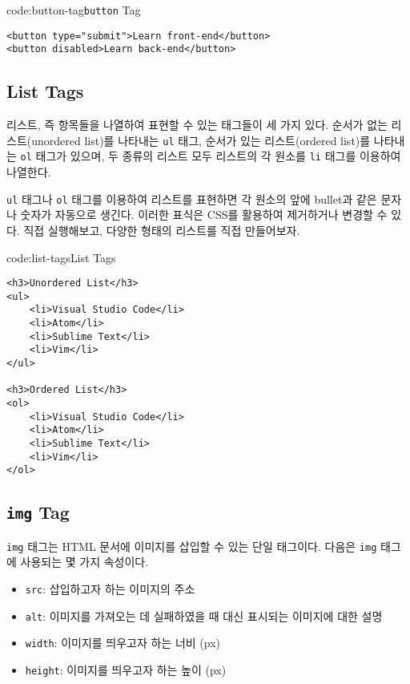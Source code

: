 \begin{codeenv}{code:button-tag}{\texttt{button} Tag}\begin{verbatim}
<button type="submit">Learn front-end</button>
<button disabled>Learn back-end</button>
\end{verbatim}
\end{codeenv}

\subsection*{List Tags}
리스트, 즉 항목들을 나열하여 표현할 수 있는 태그들이 세 가지 있다. 순서가 없는 리스트(unordered list)를 나타내는 \texttt{ul} 태그, 순서가 있는 리스트(ordered list)를 나타내는 \texttt{ol} 태그가 있으며, 두 종류의 리스트 모두 리스트의 각 원소를 \texttt{li} 태그를 이용하여 나열한다.

\texttt{ul} 태그나 \texttt{ol} 태그를 이용하여 리스트를 표현하면 각 원소의 앞에 bullet과 같은 문자나 숫자가 자동으로 생긴다. 이러한 표식은 CSS를 활용하여 제거하거나 변경할 수 있다. \를 직접 실행해보고, 다양한 형태의 리스트를 직접 만들어보자.

\begin{codeenv}{code:list-tags}{List Tags}\begin{verbatim}
<h3>Unordered List</h3>
<ul>
    <li>Visual Studio Code</li>
    <li>Atom</li>
    <li>Sublime Text</li>
    <li>Vim</li>
</ul>

<h3>Ordered List</h3>
<ol>
    <li>Visual Studio Code</li>
    <li>Atom</li>
    <li>Sublime Text</li>
    <li>Vim</li>
</ol>
\end{verbatim}
\end{codeenv}

\subsection*{\texttt{img} Tag}
\texttt{img} 태그는 HTML 문서에 이미지를 삽입할 수 있는 단일 태그이다. 다음은 \texttt{img} 태그에 사용되는 몇 가지 속성이다.

\begin{itemize}
    \item \texttt{src}: 삽입하고자 하는 이미지의 주소
    \item \texttt{alt}: 이미지를 가져오는 데 실패하였을 때 대신 표시되는 이미지에 대한 설명
    \item \texttt{width}: 이미지를 띄우고자 하는 너비 (px)
    \item \texttt{height}: 이미지를 띄우고자 하는 높이 (px)
\end{itemize}

